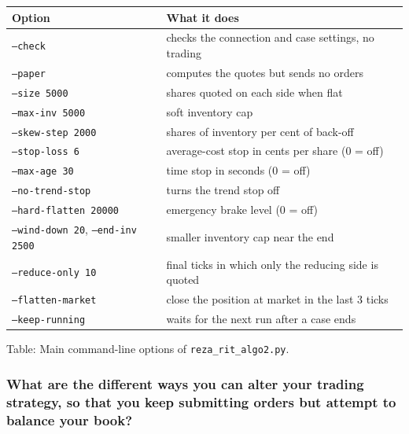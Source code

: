 \documentclass{article}
\begin{document}
\begin{center}
\begin{tabular}{|l|p{8.2cm}|}
\hline
Option & What it does \\
\hline
\texttt{--check}            & checks the connection and case settings, no trading \\
\texttt{--paper}            & computes the quotes but sends no orders \\
\texttt{--size 5000}        & shares quoted on each side when flat \\
\texttt{--max-inv 5000}     & soft inventory cap \\
\texttt{--skew-step 2000}   & shares of inventory per cent of back-off \\
\texttt{--stop-loss 6}      & average-cost stop in cents per share (0 = off) \\
\texttt{--max-age 30}       & time stop in seconds (0 = off) \\
\texttt{--no-trend-stop}    & turns the trend stop off \\
\texttt{--hard-flatten 20000} & emergency brake level (0 = off) \\
\texttt{--wind-down 20}, \texttt{--end-inv 2500} & smaller inventory cap near the end \\
\texttt{--reduce-only 10}   & final ticks in which only the reducing side is quoted \\
\texttt{--flatten-market}   & close the position at market in the last 3 ticks \\
\texttt{--keep-running}     & waits for the next run after a case ends \\
\hline
\end{tabular}

\smallskip
Table: Main command-line options of \texttt{reza\_rit\_algo2.py}.
\end{center}

\subsubsection{What are the different ways you can alter your trading strategy, so that you keep
submitting orders but attempt to balance your book?}
\end{document}

